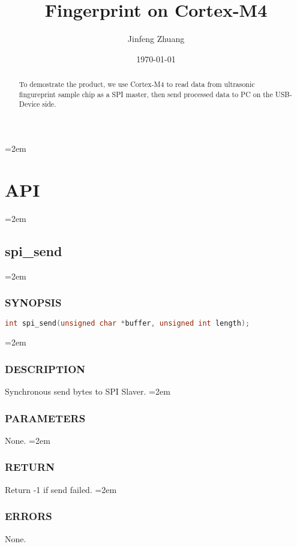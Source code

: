 \documentclass[a4paper]{article}
\title{Fingerprint on Cortex-M4}
\author{Jinfeng Zhuang}
\date{\today}
\let\oldsection\section
\renewcommand{\section}{\leftskip=2em \oldsection}
\let\oldsubsection\subsection
\renewcommand{\subsection}{\leftskip=2em \oldsubsection}
\let\oldsubsubsection\subsubsection
\renewcommand{\subsubsection}{\leftskip=2em \oldsubsubsection}
\begin{document}
\maketitle

\thispagestyle{empty}

\newpage

\begin{abstract}
To demostrate the product, we use Cortex-M4 to read data from ultrasonic fingureprint sample chip as a SPI master, then send processed data to PC on the USB-Device side.
\end{abstract}

\setcounter{page}{1}

\newpage

\tableofcontents

\newpage

\setcounter{page}{1}

\section{API}

\subsection{spi\_send}
\subsubsection{SYNOPSIS}
\begin{lstlisting}[language=C]
int spi_send(unsigned char *buffer, unsigned int length);
\end{lstlisting}
\subsubsection{DESCRIPTION}
Synchronous send bytes to SPI Slaver.
\subsubsection{PARAMETERS}
None.
\subsubsection{RETURN}
Return -1 if send failed.
\subsubsection{ERRORS}
None.
\end{document}
